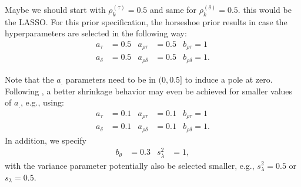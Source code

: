 Maybe we should start with $\rho^{(\tau)}_k=0.5$ and same for $\rho^{(\delta)}_k=0.5$. this would be the LASSO.
For this prior specification, the horseshoe prior results in case the hyperparameters are selected in the following way:
\begin{align*}
    a_{\tau} &= 0.5 & a_{\rho\tau} &= 0.5 & b_{\rho\tau} = 1\\
    a_{\delta} &= 0.5 & a_{\rho\delta} &= 0.5 & b_{\rho\delta} = 1.
\end{align*}

Note that the $a_.$ parameters need to be in $(0, 0.5]$ to induce a pole at zero. Following \citet{CadonnaFruehwirth-SchnatterKnaus_triple_gamma:2019}, a better shrinkage behavior may even be achieved for smaller values of $a_.$, e.g., using:
\begin{align*}
    a_{\tau} &= 0.1 & a_{\rho\tau} &= 0.1 & b_{\rho\tau} = 1\\
    a_{\delta} &= 0.1 & a_{\rho\delta} &= 0.1 & b_{\rho\delta} = 1.
\end{align*}
In addition, we specify
\begin{align*}
    b_{\theta} &= 0.3& s^2_{\lambda} &= 1,
\end{align*}
with the variance parameter potentially also be selected smaller, e.g., $s^2_{\lambda} = 0.5$ or $s_{\lambda} = 0.5$.
